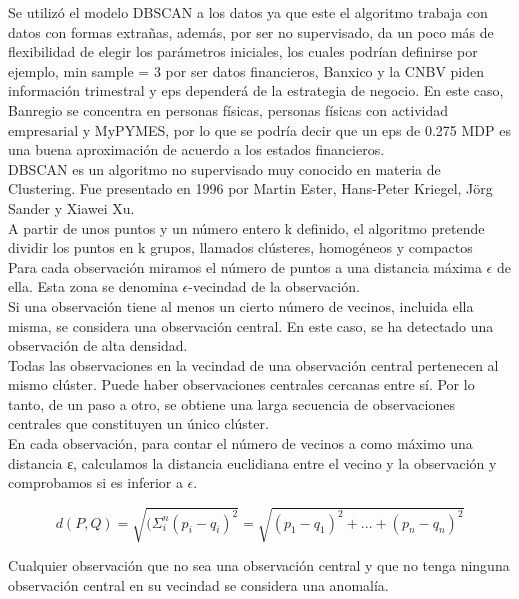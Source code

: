 \documentclass{article}
\begin{document}
Se utilizó el modelo DBSCAN a los datos ya que este el algoritmo trabaja con datos con formas extrañas, además, por ser no supervisado, da un poco más de flexibilidad de elegir los parámetros iniciales, los cuales podrían definirse por ejemplo, min sample = 3 por ser datos financieros, Banxico y la CNBV piden información trimestral y eps dependerá de la estrategia de negocio. En este caso, Banregio se concentra en personas físicas, personas físicas con actividad empresarial y MyPYMES, por lo que se podría decir que un eps de 0.275 MDP es una buena aproximación de acuerdo a los estados financieros.
\\

DBSCAN es un algoritmo no supervisado muy conocido en materia de Clustering. Fue presentado en 1996 por Martin Ester, Hans-Peter Kriegel, Jörg Sander y Xiawei Xu.
\\

A partir de unos puntos y un número entero k definido, el algoritmo pretende dividir los puntos en k grupos, llamados clústeres, homogéneos y compactos
\\

Para cada observación miramos el número de puntos a una distancia máxima $\epsilon$ de ella. Esta zona se denomina $\epsilon$-vecindad de la observación.
\\

Si una observación tiene al menos un cierto número de vecinos, incluida ella misma, se considera una observación central. En este caso, se ha detectado una observación de alta densidad.
\\

Todas las observaciones en la vecindad de una observación central pertenecen al mismo clúster. Puede haber observaciones centrales cercanas entre sí. Por lo tanto, de un paso a otro, se obtiene una larga secuencia de observaciones centrales que constituyen un único clúster.
\\

En cada observación, para contar el número de vecinos a como máximo una distancia ε, calculamos la distancia euclidiana entre el vecino y la observación y comprobamos si es inferior a $\epsilon$.

$$d(P,Q) = \sqrt{(\Sigma_i^n(p_i - q_i)^2} = \sqrt{(p_1 - q_1)^2 + ... + (p_n - q_n)^2}$$

Cualquier observación que no sea una observación central y que no tenga ninguna observación central en su vecindad se considera una anomalía.
\\
\end{document}
